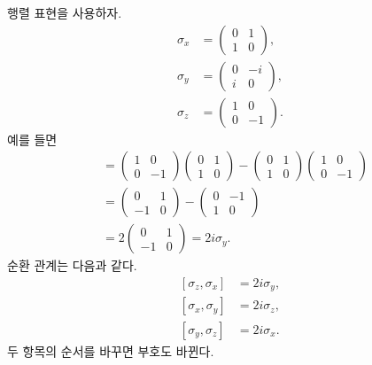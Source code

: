 행렬 표현을 사용하자.
\begin{equation}
\begin{aligned}
\sigma_x&=
\begin{pmatrix}0&1\\1&0\end{pmatrix},\\[0.4em]
\sigma_y&=
\begin{pmatrix}0&-i\\i&0\end{pmatrix},\\[0.4em]
\sigma_z&=
\begin{pmatrix}1&0\\0&-1\end{pmatrix}.
\end{aligned}
\end{equation}
예를 들면
\begin{align}
[\sigma_z,\sigma_x]
&=
\begin{pmatrix}1&0\\0&-1\end{pmatrix}
\begin{pmatrix}0&1\\1&0\end{pmatrix}
-
\begin{pmatrix}0&1\\1&0\end{pmatrix}
\begin{pmatrix}1&0\\0&-1\end{pmatrix}\\
&=
\begin{pmatrix}0&1\\-1&0\end{pmatrix}
-
\begin{pmatrix}0&-1\\1&0\end{pmatrix}\\
&=2
\begin{pmatrix}0&1\\-1&0\end{pmatrix}
=2i\sigma_y.
\end{align}
순환 관계는 다음과 같다.
\begin{equation}
\begin{aligned}
[\sigma_z,\sigma_x]&=2i\sigma_y,\\
[\sigma_x,\sigma_y]&=2i\sigma_z,\\
[\sigma_y,\sigma_z]&=2i\sigma_x.
\end{aligned}
\label{eq:l5-pauli-commutators}
\end{equation}
두 항목의 순서를 바꾸면 부호도 바뀐다.

